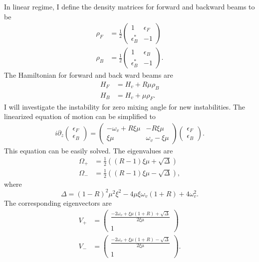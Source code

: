 In linear regime, I define the density matrices for forward and backward beams to be
\begin{align*}
   \rho_F &= \frac{1}{2} \begin{pmatrix}
   1 & \epsilon_F \\
   \epsilon_B^* & -1
   \end{pmatrix} \\
   \rho_B &= \frac{1}{2} \begin{pmatrix}
   1 & \epsilon_B \\
   \epsilon_B^* & -1
   \end{pmatrix}.
\end{align*}
The Hamiltonian for forward and back ward beams are
\begin{align*}
   H_F &= H_v + R \mu \rho_B \\
   H_B &= H_v + \mu \rho_F.
\end{align*}
I will investigate the instability for zero mixing angle for new instabilities. The linearized equation of motion can be simplified to
\begin{align*}
   i\partial_z \begin{pmatrix}
   \epsilon_F \\
   \epsilon_B
   \end{pmatrix} = \begin{pmatrix}
   -\omega_v + R \xi \mu & - R \xi \mu \\
   \xi \mu & \omega_v - \xi \mu
   \end{pmatrix} \begin{pmatrix}
   \epsilon_F \\
   \epsilon_B
   \end{pmatrix}.
\end{align*}
This equation can be easily solved. The eigenvalues are
\begin{align*}
   \Omega_+ &= \frac{1}{2} ( (R-1)\xi\mu + \sqrt{\Delta} ) \\
   \Omega_- &= \frac{1}{2} ( (R-1)\xi\mu - \sqrt{\Delta} ),
\end{align*}
where
\begin{equation}
   \Delta = (1-R)^2 \mu^2 \xi^2 - 4\mu\xi \omega_v (1+R) + 4\omega_v^2.
\end{equation}
The corresponding eigenvectors are
\begin{align*}
   V_+ &=\begin{pmatrix}
   \frac{ -2\omega_v + \xi \mu (1+R) + \sqrt{\Delta} }{2\xi\mu} \\
   1
   \end{pmatrix} \\
   V_- &=\begin{pmatrix}
   \frac{ -2\omega_v + \xi \mu (1+R) - \sqrt{\Delta} }{2\xi\mu} \\
   1
   \end{pmatrix}.
\end{align*}
